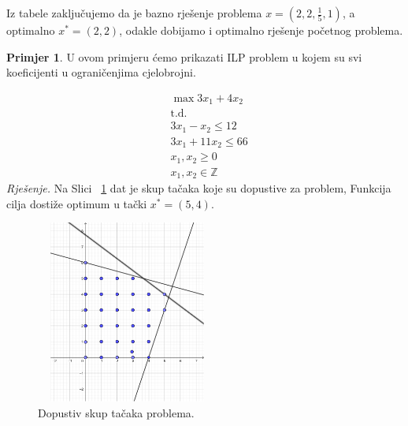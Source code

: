 \documentclass[a4paper, utf8, 11pt, colorlinks]{book}
\theoremstyle{definition}
\newtheorem{primjer}{Primjer}[chapter]
\begin{document}
Iz tabele zaključujemo da je bazno rješenje problema 
$x=(2,2, \frac{1}{5}, 1)$, a optimalno $x^* = (2, 2)$, odakle dobijamo i optimalno rješenje početnog problema. 


\begin{primjer} U ovom primjeru ćemo prikazati ILP problem u kojem su svi koeficijenti u ograničenjima cjelobrojni.
	\end{primjer}
\begin{align*}
    &\max 3 x_1 + 4 x_2 \\
    &\mbox{t.d.} \\
    & 3 x_1 - x_2 \leq 12 \\
    & 3 x_1 + 11 x_2 \leq 66 \\
    & x_1, x_2 \geq 0 \\
    & x_1, x_2 \in \mathbb{Z}
\end{align*}
\emph{Rješenje. }
Na Slici~ \ref{fig:region_ilp_primjer_2} dat je skup tačaka koje su dopustive za problem, Funkcija cilja dostiže optimum u tački $x^*=(5,4)$.
\begin{figure}
    \centering
    \includegraphics[width=170pt,height=170pt]{region_ilp_primjer_2.eps}
    \caption{Dopustiv skup tačaka problema.}
    \label{fig:region_ilp_primjer_2}
\end{figure}
\end{document}
